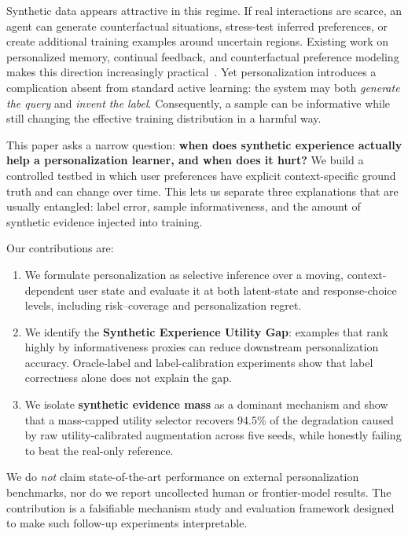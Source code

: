 \documentclass[10pt,twocolumn]{article}
\begin{document}
Synthetic data appears attractive in this regime. If real interactions are scarce, an agent can generate counterfactual situations, stress-test inferred preferences, or create additional training examples around uncertain regions. Existing work on personalized memory, continual feedback, and counterfactual preference modeling makes this direction increasingly practical~\cite{personamem,pahf,prefpalette}. Yet personalization introduces a complication absent from standard active learning: the system may both \emph{generate the query} and \emph{invent the label}. Consequently, a sample can be informative while still changing the effective training distribution in a harmful way.

This paper asks a narrow question: \textbf{when does synthetic experience actually help a personalization learner, and when does it hurt?} We build a controlled testbed in which user preferences have explicit context-specific ground truth and can change over time. This lets us separate three explanations that are usually entangled: label error, sample informativeness, and the amount of synthetic evidence injected into training.

Our contributions are:
\begin{enumerate}[leftmargin=1.2em,itemsep=1pt]
\item We formulate personalization as selective inference over a moving, context-dependent user state and evaluate it at both latent-state and response-choice levels, including risk--coverage and personalization regret.
\item We identify the \textbf{Synthetic Experience Utility Gap}: examples that rank highly by informativeness proxies can reduce downstream personalization accuracy. Oracle-label and label-calibration experiments show that label correctness alone does not explain the gap.
\item We isolate \textbf{synthetic evidence mass} as a dominant mechanism and show that a mass-capped utility selector recovers 94.5\% of the degradation caused by raw utility-calibrated augmentation across five seeds, while honestly failing to beat the real-only reference.
\end{enumerate}

We do \emph{not} claim state-of-the-art performance on external personalization benchmarks, nor do we report uncollected human or frontier-model results. The contribution is a falsifiable mechanism study and evaluation framework designed to make such follow-up experiments interpretable.
\end{document}
